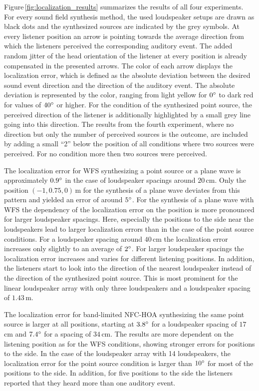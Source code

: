 %
Figure\,\ref{fig:localization_results} summarizes the results of all four
experiments. For every sound field synthesis method, the used loudspeaker setups
are drawn as black dots and the synthesized sources are indicated by the grey
symbols. At every listener position an arrow is pointing towards the average direction
from which the listeners perceived the corresponding auditory event. The added random jitter
of the head orientation of the listener at every position is already compensated
in the presented arrows. The color of each arrow displays the localization
error, which is defined as the absolute deviation between the desired sound
event direction and the direction of the auditory event. The absolute deviation
is represented by the color, ranging from light yellow for $0^\circ$ to dark red
for values of $40^\circ$ or higher.
For the
condition of the synthesized point source, the perceived direction of the listener is
additionally highlighted by a small grey line going into this direction.
The results from the fourth experiment, where no direction but only the number
of perceived sources is the outcome, are included by adding a small ``2'' below the
position of all conditions where two sources were perceived. For no condition
more then two sources were perceived.

The localization error for \ac{WFS} synthesizing a point source or a plane wave
is approximately $0.9^\circ$ in the case of loudspeaker spacings around
$20$\,cm. Only the position $(-1,0.75,0)$\,m for the synthesis of a plane wave
deviates from this pattern and yielded an error of around $5^\circ$. For the synthesis
of a plane wave with \ac{WFS} the dependency of the localization error on the
position is more pronounced for larger loudspeaker spacings. Here,
especially the positions to the side near the loudspeakers lead to larger
localization errors than in the case of the point source conditions. For a
loudspeaker spacing around $40$\,cm the localization error increases only slightly
to an average of $2^\circ$. For larger loudspeaker spacings the
localization error increases and varies for different listening
positions. In addition, the listeners start to look into the direction of the
nearest loudspeaker instead of the direction of the synthesized point source.
This is most prominent for the linear loudspeaker array with only three
loudspeakers and a loudspeaker spacing of $1.43$\,m.

The localization error for band-limited \ac{NFC-HOA} synthesizing the same
point source is larger at all positions, starting at $3.8^\circ$ for a
loudspeaker spacing of $17$\,cm and $7.4^\circ$ for a spacing of $34$\,cm.
The results are more dependent on the listening position as for the \ac{WFS}
conditions, showing stronger errors for positions to the side.
In the case of the loudspeaker array with 14 loudspeakers, the
localization error for the point source condition is larger than $10^\circ$ for
most of the positions to the side. In addition, for five positions to the side
the listeners reported that they heard more than one auditory event.

